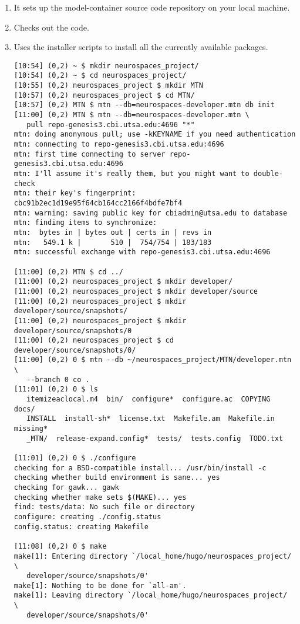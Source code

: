 \documentclass[12pt]{article}
\begin{document}
\begin{itemize}
\begin{enumerate}
\item It sets up the model-container source code repository on your local machine.
\item Checks out the code.
\item Uses the installer scripts to install all the currently available packages.
\begin{verbatim}
[10:54] (0,2) ~ $ mkdir neurospaces_project/
[10:54] (0,2) ~ $ cd neurospaces_project/
[10:55] (0,2) neurospaces_project $ mkdir MTN
[10:57] (0,2) neurospaces_project $ cd MTN/
[10:57] (0,2) MTN $ mtn --db=neurospaces-developer.mtn db init
[11:00] (0,2) MTN $ mtn --db=neurospaces-developer.mtn \
   pull repo-genesis3.cbi.utsa.edu:4696 "*"
mtn: doing anonymous pull; use -kKEYNAME if you need authentication
mtn: connecting to repo-genesis3.cbi.utsa.edu:4696
mtn: first time connecting to server repo-genesis3.cbi.utsa.edu:4696
mtn: I'll assume it's really them, but you might want to double-check
mtn: their key's fingerprint: cbc91b2ec1d19e95f64cb164cc2166f4bdfe7bf4
mtn: warning: saving public key for cbiadmin@utsa.edu to database
mtn: finding items to synchronize:
mtn:  bytes in | bytes out | certs in | revs in
mtn:   549.1 k |       510 |  754/754 | 183/183
mtn: successful exchange with repo-genesis3.cbi.utsa.edu:4696

[11:00] (0,2) MTN $ cd ../
[11:00] (0,2) neurospaces_project $ mkdir developer/
[11:00] (0,2) neurospaces_project $ mkdir developer/source
[11:00] (0,2) neurospaces_project $ mkdir developer/source/snapshots/
[11:00] (0,2) neurospaces_project $ mkdir developer/source/snapshots/0
[11:00] (0,2) neurospaces_project $ cd developer/source/snapshots/0/
[11:00] (0,2) 0 $ mtn --db ~/neurospaces_project/MTN/developer.mtn \
   --branch 0 co .
[11:01] (0,2) 0 $ ls
   itemizeaclocal.m4  bin/  configure*  configure.ac  COPYING  docs/ 
   INSTALL  install-sh*  license.txt  Makefile.am  Makefile.in  missing* 
   _MTN/  release-expand.config*  tests/  tests.config  TODO.txt

[11:01] (0,2) 0 $ ./configure 
checking for a BSD-compatible install... /usr/bin/install -c
checking whether build environment is sane... yes
checking for gawk... gawk
checking whether make sets $(MAKE)... yes
find: tests/data: No such file or directory
configure: creating ./config.status
config.status: creating Makefile

[11:08] (0,2) 0 $ make
make[1]: Entering directory `/local_home/hugo/neurospaces_project/  \
   developer/source/snapshots/0'
make[1]: Nothing to be done for `all-am'.
make[1]: Leaving directory `/local_home/hugo/neurospaces_project/  \
   developer/source/snapshots/0'


\end{verbatim}
\end{enumerate}
\end{itemize}
\end{document}
